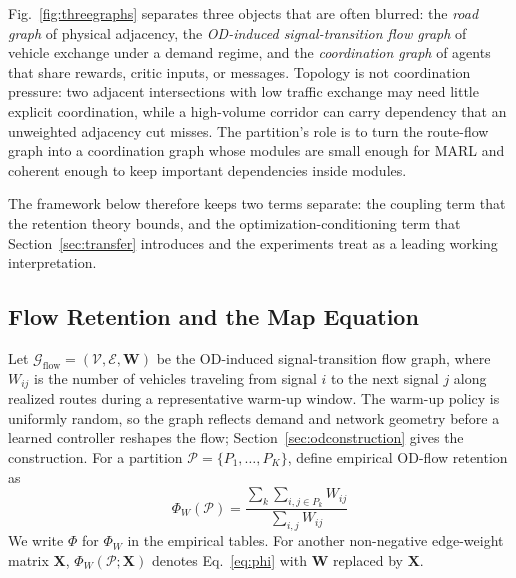 \documentclass[journal]{IEEEtran}
\theoremstyle{definition}
\begin{document}
Fig.~\ref{fig:threegraphs} separates three objects that are often blurred: the \emph{road graph} of physical adjacency, the \emph{OD-induced signal-transition flow graph} of vehicle exchange under a demand regime, and the \emph{coordination graph} of agents that share rewards, critic inputs, or messages.
Topology is not coordination pressure: two adjacent intersections with low traffic exchange may need little explicit coordination, while a high-volume corridor can carry dependency that an unweighted adjacency cut misses. The partition's role is to turn the route-flow graph into a coordination graph whose modules are small enough for MARL and coherent enough to keep important dependencies inside modules.

The framework below therefore keeps two terms separate: the coupling term that the retention theory bounds, and the optimization-conditioning term that Section~\ref{sec:transfer} introduces and the experiments treat as a leading working interpretation.

\subsection{Flow Retention and the Map Equation}
\label{sec:flowretention}

Let $\mathcal{G}_{\mathrm{flow}}=(\mathcal{V},\mathcal{E},\mathbf{W})$ be the OD-induced signal-transition flow graph, where $W_{ij}$ is the number of vehicles traveling from signal $i$ to the next signal $j$ along realized routes during a representative warm-up window. The warm-up policy is uniformly random, so the graph reflects demand and network geometry before a learned controller reshapes the flow;
Section~\ref{sec:odconstruction} gives the construction.
For a partition $\mathcal{P}=\{P_1,\ldots,P_K\}$, define empirical OD-flow retention as
\begin{equation}
    \Phi_W(\mathcal{P})
    =
    \frac{\sum_k\sum_{i,j\in P_k} W_{ij}}
    {\sum_{i,j} W_{ij}}
    \label{eq:phi}
\end{equation}
We write $\Phi$ for $\Phi_W$ in the empirical tables. For another non-negative edge-weight matrix $\mathbf{X}$, $\Phi_W(\mathcal{P};\mathbf{X})$ denotes Eq.~\eqref{eq:phi} with $\mathbf{W}$ replaced by $\mathbf{X}$.
\end{document}
